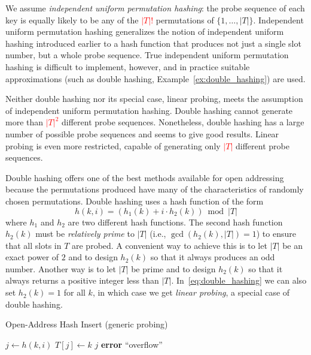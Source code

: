 We assume \emph{independent uniform permutation hashing}: the probe sequence of each key is equally likely to be any of the \textcolor{red}{\(|T|!\)} permutations of \(\{1,\dots,|T|\}\).
Independent uniform permutation hashing generalizes the notion of independent uniform hashing introduced earlier to a hash function that produces not just a single slot number, but a whole probe sequence. 
True independent uniform permutation hashing is difficult to implement, however, and in practice suitable approximations (such as double hashing,  Example~\ref{ex:double_hashing}) are used.

Neither double hashing nor its special case, linear probing, meets the assumption of independent uniform permutation hashing. 
Double hashing cannot generate more than \textcolor{red}{\(|T|^2\)} different probe sequences.
Nonetheless, double hashing has a large number of possible probe sequences and seems to give good results. 
Linear probing is even more restricted, capable of generating only \textcolor{red}{\(|T|\)} different probe sequences.

\begin{example}
  \label{ex:double_hashing}
  Double hashing offers one of the best methods available for open addressing because the permutations produced have many of the characteristics of randomly chosen permutations. 
  Double hashing uses a hash function of the form
  \begin{equation}
    \label{eq:double_hashing}
  h(k,i) = (h_1(k) + i \cdot h_2(k)) \bmod |T|
  \end{equation}
  where \(h_1\) and \(h_2\) are two different hash functions.
  The second hash function \(h_2(k)\) must be \emph{relatively prime} to \(|T|\) (i.e., \(\gcd(h_2(k),|T|)=1\)) to ensure that all slots in \(T\) are probed.
  A convenient way to achieve this is to let \(|T|\) be an exact power of \(2\) and to design \(h_2(k)\) so that it always produces an odd number.
  Another way is to let \(|T|\) be prime and to design \(h_2(k)\) so that it always returns a positive integer less than \(|T|\).
  In~\eqref{eq:double_hashing} we can also set \(h_2(k) = 1\) for all \(k\), in which case we get \emph{linear probing}, a special case of double hashing.
\end{example}

\begin{algorithm}[htb]
  \caption{Open-Address Hash Insert (generic probing)}
  \label{alg:open_address_insert}
  \begin{algorithmic}[1]
        \State $j \gets h(k,i)$
          \State $T[j] \gets k$
          \State \Return $j$
        \EndIf
      \EndFor
      \State \textbf{error} ``overflow''
    \EndFunction
  \end{algorithmic}
\end{algorithm}

